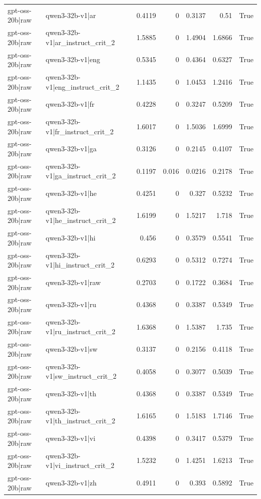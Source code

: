 \begin{table}
\begin{tabular}{l l r r r r l}
gpt-oss-20b|raw & qwen3-32b-v1|ar & 0.4119 & 0 & 0.3137 & 0.51 & True \\
gpt-oss-20b|raw & qwen3-32b-v1|ar_instruct_crit_2 & 1.5885 & 0 & 1.4904 & 1.6866 & True \\
gpt-oss-20b|raw & qwen3-32b-v1|eng & 0.5345 & 0 & 0.4364 & 0.6327 & True \\
gpt-oss-20b|raw & qwen3-32b-v1|eng_instruct_crit_2 & 1.1435 & 0 & 1.0453 & 1.2416 & True \\
gpt-oss-20b|raw & qwen3-32b-v1|fr & 0.4228 & 0 & 0.3247 & 0.5209 & True \\
gpt-oss-20b|raw & qwen3-32b-v1|fr_instruct_crit_2 & 1.6017 & 0 & 1.5036 & 1.6999 & True \\
gpt-oss-20b|raw & qwen3-32b-v1|ga & 0.3126 & 0 & 0.2145 & 0.4107 & True \\
gpt-oss-20b|raw & qwen3-32b-v1|ga_instruct_crit_2 & 0.1197 & 0.016 & 0.0216 & 0.2178 & True \\
gpt-oss-20b|raw & qwen3-32b-v1|he & 0.4251 & 0 & 0.327 & 0.5232 & True \\
gpt-oss-20b|raw & qwen3-32b-v1|he_instruct_crit_2 & 1.6199 & 0 & 1.5217 & 1.718 & True \\
gpt-oss-20b|raw & qwen3-32b-v1|hi & 0.456 & 0 & 0.3579 & 0.5541 & True \\
gpt-oss-20b|raw & qwen3-32b-v1|hi_instruct_crit_2 & 0.6293 & 0 & 0.5312 & 0.7274 & True \\
gpt-oss-20b|raw & qwen3-32b-v1|raw & 0.2703 & 0 & 0.1722 & 0.3684 & True \\
gpt-oss-20b|raw & qwen3-32b-v1|ru & 0.4368 & 0 & 0.3387 & 0.5349 & True \\
gpt-oss-20b|raw & qwen3-32b-v1|ru_instruct_crit_2 & 1.6368 & 0 & 1.5387 & 1.735 & True \\
gpt-oss-20b|raw & qwen3-32b-v1|sw & 0.3137 & 0 & 0.2156 & 0.4118 & True \\
gpt-oss-20b|raw & qwen3-32b-v1|sw_instruct_crit_2 & 0.4058 & 0 & 0.3077 & 0.5039 & True \\
gpt-oss-20b|raw & qwen3-32b-v1|th & 0.4368 & 0 & 0.3387 & 0.5349 & True \\
gpt-oss-20b|raw & qwen3-32b-v1|th_instruct_crit_2 & 1.6165 & 0 & 1.5183 & 1.7146 & True \\
gpt-oss-20b|raw & qwen3-32b-v1|vi & 0.4398 & 0 & 0.3417 & 0.5379 & True \\
gpt-oss-20b|raw & qwen3-32b-v1|vi_instruct_crit_2 & 1.5232 & 0 & 1.4251 & 1.6213 & True \\
gpt-oss-20b|raw & qwen3-32b-v1|zh & 0.4911 & 0 & 0.393 & 0.5892 & True \\

\end{tabular}
\end{table}
